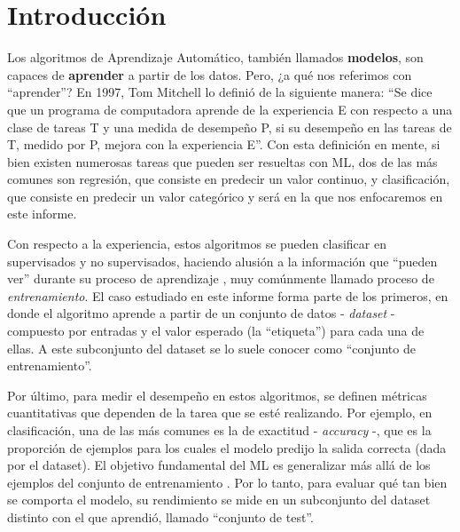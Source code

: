\documentclass[aps,twocolumn,groupedaddress]{revtex4-2}
\begin{document}

\maketitle

\section{Introducción}
Los algoritmos de Aprendizaje Automático, también llamados \textbf{modelos}, son capaces de \textbf{aprender} a partir de los datos. Pero, ¿a qué nos referimos con ``aprender''? En 1997, Tom Mitchell lo definió de la siguiente manera: ``Se dice que un programa de computadora aprende de la experiencia E con respecto a una clase de tareas T y una medida de desempeño P, si su desempeño en las tareas de T, medido por P, mejora con la experiencia E''. Con esta definición en mente, si bien existen numerosas tareas que pueden ser resueltas con ML, dos de las más comunes son regresión, que consiste en predecir un valor continuo, y clasificación, que consiste en predecir un valor categórico y será en la que nos enfocaremos en este informe. 

Con respecto a la experiencia, estos algoritmos se pueden clasificar en supervisados y no supervisados, haciendo alusión a la información que ``pueden ver'' durante su proceso de aprendizaje \cite{hands-on-ML-sklearn-tf}, muy comúnmente llamado proceso de \textit{entrenamiento}. El caso estudiado en este informe forma parte de los primeros, en donde el algoritmo aprende a partir de un conjunto de datos - \textit{dataset} - compuesto por entradas y el valor esperado (la ``etiqueta'') para cada una de ellas. A este subconjunto del dataset se lo suele conocer como ``conjunto de entrenamiento''.

Por último, para medir el desempeño en estos algoritmos, se definen métricas cuantitativas que dependen de la tarea que se esté realizando. Por ejemplo, en clasificación, una de las más comunes es la de exactitud - \textit{accuracy} -, que es la proporción de ejemplos para los cuales el modelo predijo la salida correcta (dada por el dataset). El objetivo fundamental del ML es generalizar más allá de los ejemplos del conjunto de entrenamiento \cite{pedro-domingos}. Por lo tanto, para evaluar qué tan bien se comporta el modelo, su rendimiento se mide en un subconjunto del dataset distinto con el que aprendió, llamado ``conjunto de test''.
\end{document}
